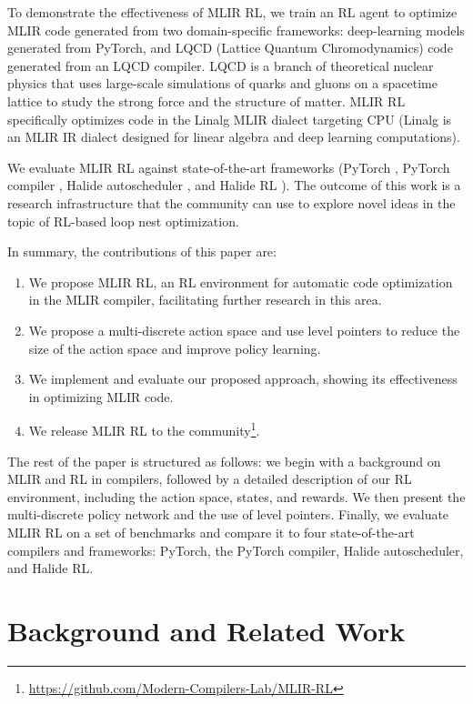 \documentclass[10pt,twocolumn]{article}
\begin{document}
To demonstrate the effectiveness of MLIR RL, we train an RL agent to optimize MLIR code generated from two domain-specific frameworks: deep-learning models generated from PyTorch, and LQCD (Lattice Quantum Chromodynamics) code generated from an LQCD compiler. LQCD is a branch of theoretical nuclear physics that uses large-scale simulations of quarks and gluons on a spacetime lattice to study the strong force and the structure of matter. MLIR RL specifically optimizes code in the Linalg MLIR dialect targeting CPU (Linalg is an MLIR IR dialect designed for linear algebra and deep learning computations).

We evaluate MLIR RL against state-of-the-art frameworks (PyTorch \cite{ref14}, PyTorch compiler \cite{ref15}, Halide autoscheduler \cite{ref16}, and Halide RL \cite{ref6}). The outcome of this work is a research infrastructure that the community can use to explore novel ideas in the topic of RL-based loop nest optimization.

In summary, the contributions of this paper are:
\begin{enumerate}
\item We propose MLIR RL, an RL environment for automatic code optimization in the MLIR compiler, facilitating further research in this area.
\item We propose a multi-discrete action space and use level pointers to reduce the size of the action space and improve policy learning.
\item We implement and evaluate our proposed approach, showing its effectiveness in optimizing MLIR code.
\item We release MLIR RL to the community\footnote{\url{https://github.com/Modern-Compilers-Lab/MLIR-RL}}.
\end{enumerate}

The rest of the paper is structured as follows: we begin with a background on MLIR and RL in compilers, followed by a detailed description of our RL environment, including the action space, states, and rewards. We then present the multi-discrete policy network and the use of level pointers. Finally, we evaluate MLIR RL on a set of benchmarks and compare it to four state-of-the-art compilers and frameworks: PyTorch, the PyTorch compiler, Halide autoscheduler, and Halide RL.

\section{Background and Related Work}
\end{document}
